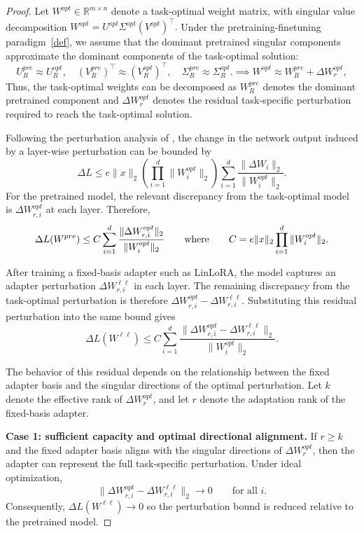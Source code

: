 \begin{proof}
Let $W^{opt} \in \mathbb{R}^{m \times n}$ denote a task-optimal weight matrix, with singular value decomposition
$W^{opt} = U^{opt}\Sigma^{opt}(V^{opt})^\top.$
Under the pretraining-finetuning paradigm~\ref{def}, we assume that the dominant pretrained singular components approximate the dominant components of the task-optimal solution:
\[
U_R^{pre} \approx U_R^{opt}, \quad
(V_R^{pre})^\top \approx (V_R^{opt})^\top,
\quad
\Sigma_R^{pre} \approx \Sigma_R^{opt}.
\implies
W^{opt} \approx W_R^{pre} + \Delta W_r^{opt},
\]
Thus, the task-optimal weights can be decomposed as $W_R^{pre}$ denotes the dominant pretrained component and $\Delta W_r^{opt}$ denotes the residual task-specific perturbation required to reach the task-optimal solution.

Following the perturbation analysis of \citet{neyshabur2018pacbayesian}, the change in the network output induced by a layer-wise perturbation can be bounded by
\[
\Delta L
\leq
e \|x\|_2
\left(
\prod_{i=1}^{d} \|W_i^{opt}\|_2
\right)
\sum_{i=1}^{d}
\frac{\|\Delta W_i\|_2}{\|W_i^{opt}\|_2}.
\]
For the pretrained model, the relevant discrepancy from the task-optimal model is $\Delta W_{r,i}^{opt}$ at each layer. Therefore,
\[
\Delta L(W^{pre})
\leq
C
\sum_{i=1}^{d}
\frac{\|\Delta W_{r,i}^{opt}\|_2}{\|W_i^{opt}\|_2}
\text{\qquad where\qquad }
C
=
e \|x\|_2
\prod_{i=1}^{d}
\|W_i^{opt}\|_2.
\]

After training a fixed-basis adapter such as LinLoRA, the model captures an adapter perturbation $\Delta W_{r,i}^{\ell \ell}$ in each layer. The remaining discrepancy from the task-optimal perturbation is therefore
$\Delta W_{r,i}^{opt} - \Delta W_{r,i}^{\ell \ell}.$ 
Substituting this residual perturbation into the same bound gives
\[
\Delta L(W^{\ell \ell})
\leq
C
\sum_{i=1}^{d}
\frac{\|\Delta W_{r,i}^{opt} - \Delta W_{r,i}^{\ell \ell}\|_2}{\|W_i^{opt}\|_2}.
\]

The behavior of this residual depends on the relationship between the fixed adapter basis and the singular directions of the optimal perturbation. Let $k$ denote the effective rank of $\Delta W_r^{opt}$, and let $r$ denote the adaptation rank of the fixed-basis adapter.

\textbf{Case 1: sufficient capacity and optimal directional alignment.} If $r \geq k$ and the fixed adapter basis aligns with the singular directions of $\Delta W_r^{opt}$, then the adapter can represent the full task-specific perturbation. Under ideal optimization,
\[
\|\Delta W_{r,i}^{opt} - \Delta W_{r,i}^{\ell \ell}\|_2
\to
0
\qquad
\text{for all } i.
\]
Consequently, $\Delta L(W^{\ell \ell}) \to 0$
so the perturbation bound is reduced relative to the pretrained model.


\end{proof}
